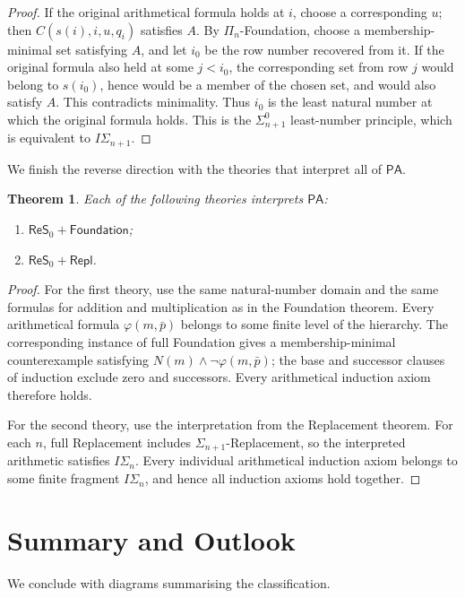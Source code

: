 \documentclass[11pt,a4paper]{article}
\newcommand{\PA}{\mathsf{PA}}
\newcommand{\ReSzero}{\mathsf{ReS}_{0}}
\theoremstyle{plain}
\newtheorem{theorem}{Theorem}[section]
\theoremstyle{definition}
\theoremstyle{remark}
\begin{document}
\begin{proof}
  If the original arithmetical formula holds at \(i\), choose a corresponding \(u\); then \(C(s(i),i,u,q_i)\) satisfies \(A\). By \(\Pi_n\)-Foundation, choose a membership-minimal set satisfying \(A\), and let \(i_0\) be the row number recovered from it. If the original formula also held at some \(j<i_0\), the corresponding set from row \(j\) would belong to \(s(i_0)\), hence would be a member of the chosen set, and would also satisfy \(A\). This contradicts minimality. Thus \(i_0\) is the least natural number at which the original formula holds. This is the \(\Sigma_{n+1}^0\) least-number principle, which is equivalent to \(I\Sigma_{n+1}\).
\end{proof}

We finish the reverse direction with the theories that interpret all of \(\PA\).
\begin{theorem}
  Each of the following theories interprets \(\PA\):
  \begin{enumerate}
    \item \(\ReSzero+\mathsf{Foundation}\);
    \item \(\ReSzero+\mathsf{Repl}\).
  \end{enumerate}
\end{theorem}
\begin{proof}
  For the first theory, use the same natural-number domain and the same formulas for addition and multiplication as in the Foundation theorem. Every arithmetical formula \(\varphi(m,\bar p)\) belongs to some finite level of the hierarchy. The corresponding instance of full Foundation gives a membership-minimal counterexample satisfying \(N(m)\wedge\neg\varphi(m,\bar p)\); the base and successor clauses of induction exclude zero and successors. Every arithmetical induction axiom therefore holds.

  For the second theory, use the interpretation from the Replacement theorem. For each \(n\), full Replacement includes \(\Sigma_{n+1}\)-Replacement, so the interpreted arithmetic satisfies \(I\Sigma_n\). Every individual arithmetical induction axiom belongs to some finite fragment \(I\Sigma_n\), and hence all induction axioms hold together.
\end{proof}

\section{Summary and Outlook}

We conclude with diagrams summarising the classification.
\end{document}
